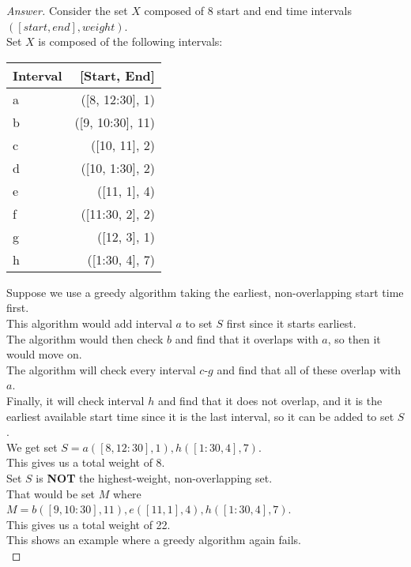 \documentclass[11pt]{article}
\theoremstyle{definition}
\theoremstyle{definition}
\theoremstyle{definition}
\begin{document}
\begin{proof}[Answer]
 Consider the set $X$ composed of 8 start and end time intervals $([start, end], weight)$. \\
 Set $X$ is composed of the following intervals:\\
 \begin{table}[h!]
 	\begin{center}
 		\label{tab:table1}
 		\begin{tabular}{l|r} %
 			\textbf{Interval} & \textbf{[Start, End]}\\
 			\hline
 			a & ([8, 12:30], 1) \\
 			b & ([9, 10:30], 11) \\
 			c & ([10, 11], 2) \\
 			d & ([10, 1:30], 2) \\
 			e & ([11, 1], 4)\\
 			f & ([11:30, 2], 2)\\
 			g & ([12, 3], 1)\\
 			h & ([1:30, 4], 7) \\
 		\end{tabular}
 	\end{center}
 \end{table}
 
 Suppose we use a greedy algorithm taking the earliest, non-overlapping start time first. \\
 \indent This algorithm would add interval $a$ to set $S$ first since it starts earliest.\\
 \indent The algorithm would then check $b$ and find that it overlaps with $a$, so then it would move on.\\
 \indent The algorithm will check every interval $c$-$g$ and find that all of these overlap with $a$.\\
 \indent Finally, it will check interval $h$ and find that it does not overlap, and it is the earliest available start time since it is the last interval, so it can be added to set $S$.\\
 \indent We get set $S = {a([8, 12:30], 1)}, {h([1:30, 4], 7)}$.\\ \indent This gives us a total weight of 8.\\
 
 Set $S$ is \textbf{NOT} the highest-weight, non-overlapping set.\\ \indent That would be set $M$ where $M = {b([9, 10:30], 11)}, {e([11, 1], 4)}, {h([1:30, 4], 7)}$.\\ \indent This gives us a total weight of 22.\\ \indent This shows an example where a greedy algorithm again fails.\\
\end{proof}
\end{document}

